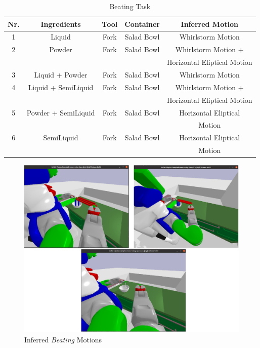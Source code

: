 \begin{table}[H]
  \centering
  \begin{tabular}{|c|c|c|c|c|}
    \hline
    \textbf{Nr.} & \textbf{Ingredients} & \textbf{Tool} & \textbf{Container} & \textbf{Inferred Motion}  \\
    \hline
    1 & Liquid & Fork & Salad Bowl & Whirlstorm Motion \\
    \hline
    2 & Powder & Fork & Salad Bowl & Whirlstorm Motion +
    \\ & & &  & Horizontal Eliptical Motion \\
    \hline
    3 & Liquid + Powder & Fork & Salad Bowl & Whirlstorm Motion \\
    \hline
    4 & Liquid + SemiLiquid & Fork & Salad Bowl & Whirlstorm Motion +
    \\ & & &  & Horizontal Eliptical Motion \\
    \hline
    5 & Powder + SemiLiquid & Fork & Salad Bowl & Horizontal Eliptical 
    \\ & & &  & Motion \\
    
    \hline
    6 & SemiLiquid & Fork & Salad Bowl & Horizontal Eliptical 
    \\ & & &  & Motion \\
    \hline
  \end{tabular}
  \caption{Beating Task}
  \label{tab:mixingtask}
\end{table}

\begin{figure}[H]
  \centering
  \includegraphics[scale=0.33]{Graphics/beating_evaluation.jpg}
  \caption{Inferred \textit{Beating} Motions}
  \label{fig:mixingverb WikiHow}
\end{figure}


